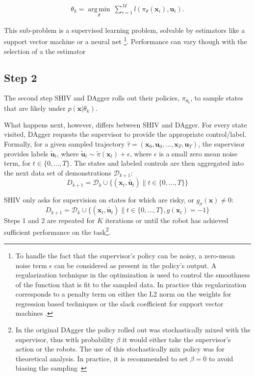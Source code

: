 \documentclass[10pt, conference]{ieeeconf}      %
\DeclareMathOperator*{\argmin}{arg\,min}
\newcommand{\bu}{\mathbf{u}}
\newcommand{\bx}{\mathbf{x}}
\newcommand{\fpnote}[1]{\ifthenelse{ \boolean{include-notes}}%
 {\textcolor{blue}{\textbf{FP: #1}}}{}}
\begin{document}
 \vspace{-2ex}
\begin{align}\label{eq:super_objj}
\theta_{k} = \underset{\theta}{\argmin} \: \sum_{i=1}^{M} l(\pi_{\theta}(\bx_i),\bu_i).
\end{align}


This sub-problem is a supervised learning problem, solvable by estimators like a support vector machine or a neural net \footnote{To handle the fact that the supervisor's policy can be noisy, a zero-mean noise term $\epsilon$ 
can be considered as present in the policy's output.  A regularization technique in the optimization is
used to control the smoothness of the function that is fit to the sampled data. In practice this regularization corresponds to a penalty term on either the L2 norm on the weights for regression based techniques or the slack coefficient for support vector machines \cite{scholkopf2002learning}.}. Performance can vary though with the selection of a the estimator \cite{scholkopf2002learning} 
 

 \subsection{Step 2}
The second step SHIV and DAgger rolls out their policies, $\pi_{\theta_{k}}$, to sample states that are likely under $p(\bx|\theta_{k})$. 

What happens next, however, differs between SHIV and DAgger. For every state visited, DAgger requests the supervisor to provide the appropriate control/label. Formally, for a given sampled trajectory  $\hat{\tau} = (\bx_0,\bu_0,...,\bx_T,\bu_T )$, the supervisor provides labels $\tilde{\bu}_t$, where $\tilde{\bu}_t \sim \tilde{\pi}(\bx_t) + \epsilon$, where $\epsilon$ is a small zero mean noise term, for $t\in \{0, \ldots, T\}$.
The states and labeled controls are then aggregated into the next data set of demonstrations $\mathcal{D}_{k+1}$:
$$D_{k+1}=\mathcal{D}_k \cup \{(\bx_t,\tilde{\bu_t})\|t\in\{0,\ldots,T\}\} $$



SHIV only asks for supervision on states for which are risky, or $g_{\sigma}(\bx) \neq 0$: 
$$D_{k+1}=\mathcal{D}_k \cup \{(\bx_t,\tilde{\bu_t})\|t\in\{0,\ldots,T\},g(\bx_t)=-1\}$$
Steps 1 and 2 are repeated for $K$ iterations or until 
the robot has achieved sufficient performance on the task\footnote{In the original DAgger the policy rolled out
was stochastically mixed with the supervisor, thus with probability $\beta$ it would either take the supervisor's action
or the robots. The use of this stochastically mix policy was for theoretical analysis. In practice, it is recommended
to set $\beta = 0$ to avoid biasing the sampling~\cite{NIPS2014_5421,ross2010reduction}}.
\end{document}
